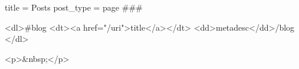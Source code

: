 title = Posts
post_type = page
###

<dl>{{#blog}}
	<dt><a href="/{{uri}}">{{title}}</a></dt>
	<dd>{{metadesc}}</dd>{{/blog}}
</dl>

<p>&nbsp;</p>
